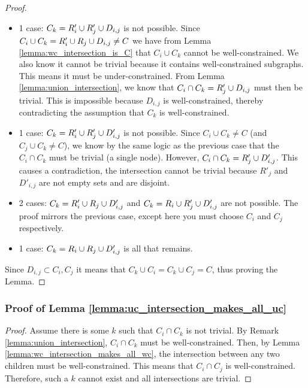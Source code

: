 \begin{proof}
\begin{itemize}
    \item 1 case: $C_k=R'_i\cup R'_j\cup D_{i,j}$ is not possible. Since $C_i\cup C_k = R'_i\cup R_j\cup D_{i,j}\neq C$ we have from Lemma \ref{lemma:wc_intersection_is_C} that $C_i\cup C_k$ cannot be well-constrained. We also know it cannot be trivial because it contains well-constrained subgraphs. This means it must be under-constrained. From Lemma \ref{lemma:union_intersection}, we know that $C_i\cap C_k=R'_j\cup D_{i,j}$ must then be trivial. This is impossible because $D_{i,j}$ is well-constrained, thereby contradicting the assumption that $C_k$ is well-constrained.

    \item 1 case: \usestwod $C_k=R'_i\cup R'_j\cup D'_{i,j}$ is not possible. Since $C_i\cup C_k\neq C$ (and $C_j\cup C_k\neq C$), we know by the same logic as the previous case that the $C_i\cap C_k$ must be trivial (a single node). However, $C_i\cap C_k=R'_j\cup D'_{i,j}$. This causes a contradiction, the intersection cannot be trivial because $R'_j$ and $D'_{i,j}$ are not empty sets and are disjoint.

    \item 2 cases: \usestwod $C_k=R'_i\cup R_j\cup D'_{i,j}$ and $C_k=R_i\cup R'_j\cup D'_{i,j}$ are not possible. The proof mirrors the previous case, except here you must choose $C_i$ and $C_j$ respectively.

    \item 1 case: $C_k=R_i\cup R_j\cup D'_{i,j}$ is all that remains.
\end{itemize}

Since $D_{i,j}\subset C_i, C_j$ it means that $C_k\cup C_i = C_k \cup C_j = C$, thus proving the Lemma.
%
\end{proof}


\subsubsection{Proof of Lemma \ref{lemma:uc_intersection_makes_all_uc}}

\begin{proof}
Assume there is some $k$ such that $C_i\cap C_k$ is not trivial. By Remark \ref{lemma:union_intersection}, $C_i\cap C_k$ must be well-constrained. Then, by Lemma \ref{lemma:wc_intersection_makes_all_wc}, the intersection between any two children must be well-constrained. This means that $C_i\cap C_j$ is well-constrained. Therefore, such a $k$ cannot exist and all intersections are trivial.
\end{proof}



